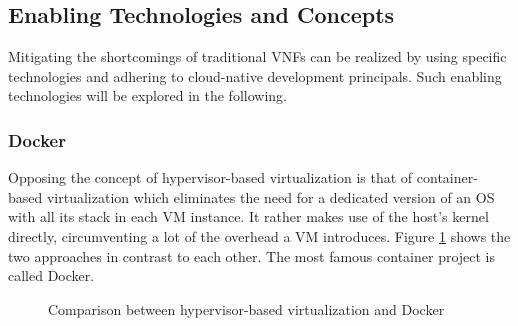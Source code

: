 

\subsection{Enabling Technologies and Concepts}
Mitigating the shortcomings of traditional VNFs can be realized by using specific technologies and adhering to cloud-native development principals. Such enabling technologies will be explored in the following.

\subsubsection{Docker}
Opposing the concept of hypervisor-based virtualization is that of container-based virtualization which eliminates the need for a dedicated version of an OS with all its stack in each VM instance. It rather makes use of the host's kernel directly, circumventing a lot of the overhead a VM introduces. Figure \ref{fig:docker} shows the two approaches in contrast to each other. The most famous container project is called Docker. 

\begin{figure}[h]%
	\centering
	\quad
	
	\caption{Comparison between hypervisor-based virtualization and Docker \cite{dockerdocu}}
	\label{fig:docker}
\end{figure}

